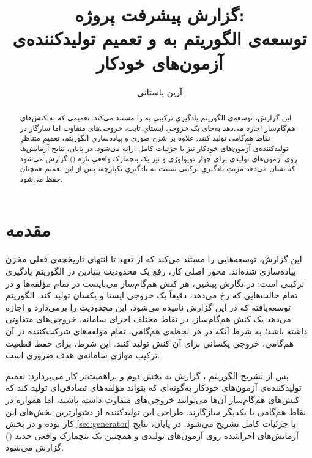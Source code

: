 \documentclass[a4paper,12pt]{article}
\title{گزارش پیشرفت پروژه:\\ توسعه‌ی الگوریتم \lr{SCL-Star} به \lr{ESCL-Star} و تعمیم تولیدکننده‌ی آزمون‌های خودکار}
\author{آرین باستانی}
\date{}
\numberwithin{algorithm}{section}
\begin{document}
\maketitle

\begin{abstract}
این گزارش، توسعه‌ی الگوریتم یادگیریِ ترکیبیِ  به  را مستند می‌کند: تعمیمی که به کنش‌های هم‌گام‌ساز اجازه می‌دهد به‌جای یک خروجیِ ایستایِ ثابت، خروجی‌های متفاوت اما سازگار در نقاط هم‌گامی تولید کنند. علاوه بر شرح صوری و پیاده‌سازیِ الگوریتم، تعمیمِ متناظرِ تولیدکننده‌ی آزمون‌های خودکار نیز با جزئیات کامل ارائه می‌شود. در پایان، نتایج آزمایش‌ها روی آزمون‌های تولیدی برای چهار توپولوژی و نیز یک بنچمارک واقعیِ تازه () گزارش می‌شود که نشان می‌دهد مزیتِ یادگیریِ ترکیبی نسبت به یادگیریِ یکپارچه، پس از این تعمیم همچنان حفظ می‌شود.
\end{abstract}

\tableofcontents
\listoffigures
\listoftables
\listofalgorithms
\clearpage

\section{مقدمه}
این گزارش، توسعه‌هایی را مستند می‌کند که از تعهد  تا انتهای تاریخچه‌ی فعلی مخزن  پیاده‌سازی شده‌اند. محور اصلی کار، رفع یک محدودیت بنیادین در الگوریتم یادگیری ترکیبی  است: در نگارش پیشین، هر کنش هم‌گام‌ساز می‌بایست در تمام مؤلفه‌ها و در تمام حالت‌هایی که رخ می‌دهد، دقیقاً یک خروجی ایستا و یکسان تولید کند. الگوریتم توسعه‌یافته که در این گزارش  نامیده می‌شود، این محدودیت را برمی‌دارد و اجازه می‌دهد یک کنش هم‌گام‌ساز، در نقاط مختلف اجرای سامانه، خروجی‌های متفاوتی داشته باشد؛ به شرط آنکه در هر لحظه‌ی هم‌گامی، تمام مؤلفه‌های شرکت‌کننده در آن هم‌گامی، خروجی یکسانی برای آن کنش تولید کنند. این شرط، برای حفظ قطعیت ترکیب موازی سامانه‌ی هدف ضروری است.

پس از تشریح الگوریتم ، گزارش به بخش دوم و پراهمیت‌تر کار می‌پردازد: تعمیم تولیدکننده‌ی آزمون‌های خودکار به‌گونه‌ای که بتواند مؤلفه‌های تصادفی‌ای تولید کند که کنش‌های هم‌گام‌ساز آن‌ها می‌توانند خروجی‌های متفاوت داشته باشند، اما همواره در نقاط هم‌گامی با یکدیگر سازگارند. طراحی این تولیدکننده از دشوارترین بخش‌های این کار بوده و در بخش \ref{sec:generator} با جزئیات کامل تشریح می‌شود. در پایان، نتایج آزمایش‌های اجراشده روی آزمون‌های تولیدی و همچنین یک بنچمارک واقعی جدید () گزارش می‌شود.
\end{document}

